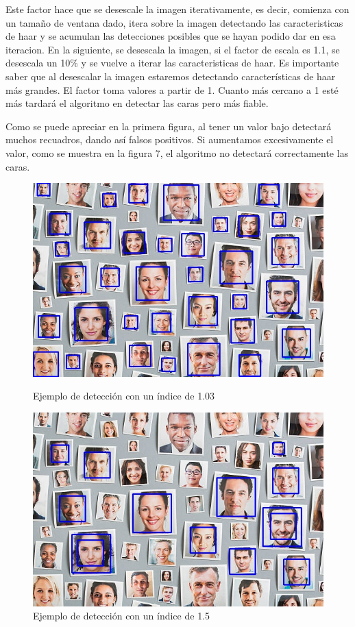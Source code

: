 \documentclass[a4paper]{article}
\begin{document}
Este factor hace que se desescale la imagen iterativamente, es decir, comienza con un tamaño de ventana dado, itera sobre la imagen detectando las caracteristicas de haar y se acumulan las detecciones posibles que se hayan podido dar en esa iteracion. En la siguiente, se desescala la imagen, si el factor de escala es 1.1, se desescala un 10\% y se vuelve a iterar las caracteristicas de haar. Es importante saber que al desescalar la imagen estaremos detectando características de haar más grandes. El factor toma valores a partir de 1. Cuanto más cercano a 1 esté más tardará el algoritmo en detectar las caras pero más fiable.

Como se puede apreciar en la primera figura, al tener un valor bajo detectará muchos recuadros, dando así falsos positivos. Si aumentamos excesivamente el valor, como se muestra en la figura 7, el algoritmo no detectará correctamente las caras.

\begin{figure}[h!]
    \centering
    \begin{minipage}[b]{0.48\textwidth}
        \includegraphics[width=\textwidth]{../img/multImages_face_detection103.jpg}
        \caption{Ejemplo de detección con un índice de 1.03}
    \end{minipage}
    \hfill
    \begin{minipage}[b]{0.48\textwidth}
        \includegraphics[width=\textwidth]{../img/multImages_face_detection15.jpg}
        \caption{Ejemplo de detección con un índice de 1.5}
    \end{minipage}
\end{figure}
\end{document}
